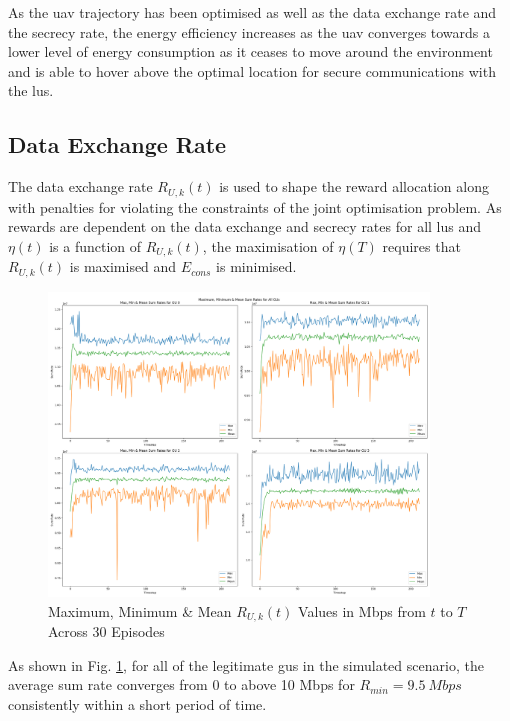 As the \acrshort{uav} trajectory has been optimised as well as the data exchange rate and the secrecy rate, the energy efficiency increases as the \acrshort{uav} converges towards a lower level of energy consumption as it ceases to move around the environment and is able to hover above the optimal location for secure communications with the \acrshort{lu}s. 

\subsection{Data Exchange Rate}
The data exchange rate $R_{U, k} (t)$ is used to shape the reward allocation along with penalties for violating the constraints of the joint optimisation problem. 
As rewards are dependent on the data exchange and secrecy rates for all \acrshort{lu}s and $\eta (t)$ is a function of $R_{U, k} (t)$, the maximisation of $\eta (T)$ requires that $R_{U, k} (t)$ is maximised and $E_{cons}$ is minimised.

\begin{figure} [ht!]
    \centering
    \includegraphics[width=0.9\textwidth]{figures/test9/fixed_1_timestep_sum_rate_all_GUs.png}
    \caption{Maximum, Minimum \& Mean $R_{U, k} (t)$ Values in Mbps from $t$ to $T$ Across 30 Episodes}
    \label{fig:timestep_sum_rates_all_gus}
\end{figure}
As shown in Fig. \ref{fig:timestep_sum_rates_all_gus}, for all of the legitimate \acrshort{gu}s in the simulated scenario, the average sum rate converges from $0$ to above 10 Mbps for $R_{min} = 9.5\ Mbps$ consistently within a short period of time. 

